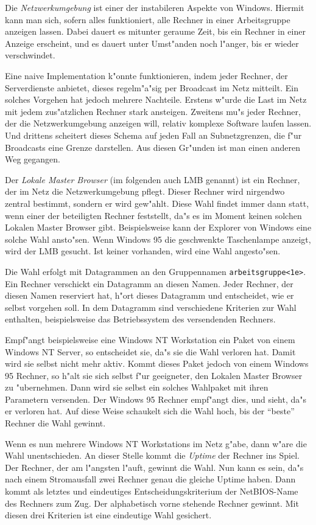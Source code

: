 \documentclass{scrartcl}
\newcommand{\nbname}{\texttt}
\newcommand{\defin}{\emph}
\begin{document}
Die \defin{Netzwerkumgebung} ist einer der instabileren Aspekte von
Windows. Hiermit kann man sich, sofern alles funktioniert, alle
Rechner in einer Arbeitsgruppe anzeigen lassen. Dabei dauert es
mitunter geraume Zeit, bis ein Rechner in einer Anzeige erscheint, und
es dauert unter Umst"anden noch l"anger, bis er wieder verschwindet.

Eine naive Implementation k"onnte funktionieren, indem jeder Rechner,
der Serverdienste anbietet, dieses regelm"a"sig per Broadcast im Netz
mitteilt. Ein solches Vorgehen hat jedoch mehrere Nachteile. Erstens
w"urde die Last im Netz mit jedem zus"atzlichen Rechner stark
ansteigen. Zweitens mu"s jeder Rechner, der die Netzwerkumgebung anzeigen
will, relativ komplexe Software laufen lassen. Und drittens scheitert dieses
Schema auf jeden Fall an Subnetzgrenzen, die f"ur Broadcasts eine
Grenze darstellen. Aus diesen Gr"unden ist man einen anderen Weg
gegangen.

Der \defin{Lokale Master Browser} (im folgenden auch LMB genannt) ist
ein Rechner, der im Netz die Netzwerkumgebung pflegt. Dieser Rechner
wird nirgendwo zentral bestimmt, sondern er wird gew"ahlt. Diese Wahl
findet immer dann statt, wenn einer der beteiligten Rechner
feststellt, da"s es im Moment keinen solchen Lokalen Master Browser
gibt.  Beispielsweise kann der Explorer von Windows eine solche Wahl
ansto"sen. Wenn Windows 95 die geschwenkte Taschenlampe anzeigt, wird
der LMB gesucht. Ist keiner vorhanden, wird eine Wahl angesto"sen.

Die Wahl erfolgt mit Datagrammen an den Gruppennamen
\nbname{arbeitsgruppe<1e>}. Ein Rechner verschickt ein Datagramm an
diesen Namen. Jeder Rechner, der diesen Namen reserviert hat, h"ort
dieses Datagramm und entscheidet, wie er selbst vorgehen soll.  In dem
Datagramm sind verschiedene Kriterien zur Wahl enthalten,
beispielsweise das Betriebssystem des versendenden Rechners.

Empf"angt beispielsweise eine Windows NT Workstation ein Paket von
einem Windows NT Server, so entscheidet sie, da"s sie die Wahl
verloren hat. Damit wird sie selbst nicht mehr aktiv. Kommt dieses
Paket jedoch von einem Windows 95 Rechner, so h"alt sie sich selbst
f"ur geeigneter, den Lokalen Master Browser zu "ubernehmen. Dann wird
sie selbst ein solches Wahlpaket mit ihren Parametern versenden.  Der
Windows 95 Rechner empf"angt dies, und sieht, da"s er verloren hat.
Auf diese Weise schaukelt sich die Wahl hoch, bis der "`beste"'
Rechner die Wahl gewinnt.

Wenn es nun mehrere Windows NT Workstations im Netz g"abe, dann
w"are die Wahl unentschieden. An dieser Stelle kommt die \emph{Uptime}
der Rechner ins Spiel. Der Rechner, der am l"angsten l"auft, gewinnt
die Wahl. Nun kann es sein, da"s nach einem Stromausfall zwei Rechner
genau die gleiche Uptime haben. Dann kommt als letztes und eindeutiges
Entscheidungskriterium der NetBIOS-Name des Rechners zum Zug. Der
alphabetisch vorne stehende Rechner gewinnt. Mit diesen drei Kriterien
ist eine eindeutige Wahl gesichert.
\end{document}
